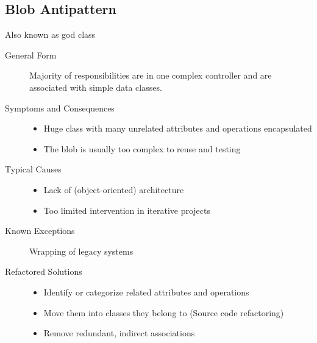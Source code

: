 \subsection{Blob Antipattern}
Also known as god class
\begin{description}
  \item[General Form] Majority of responsibilities are in one complex controller and are associated with simple data classes.
  \item[Symptoms and Consequences]
  \begin{itemize}
    \item Huge class with many unrelated attributes and operations encapsulated
    \item The blob is usually too complex to reuse and testing
  \end{itemize}
  \item[Typical Causes]
  \begin{itemize}
    \item Lack of (object-oriented) architecture
    \item Too limited intervention in iterative projects
  \end{itemize}
  \item[Known Exceptions] Wrapping of legacy systems
  \item[Refactored Solutions]
  \begin{itemize}
  	\item Identify or categorize related attributes and operations
  	\item Move them into classes they belong to (Source code refactoring)
  	\item Remove redundant, indirect associations
  \end{itemize}
\end{description}
\newpage

